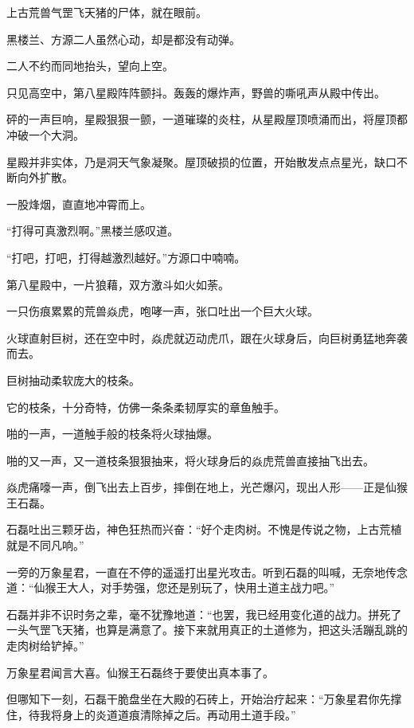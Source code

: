 
\begin{this_body}



上古荒兽气罡飞天猪的尸体，就在眼前。

黑楼兰、方源二人虽然心动，却是都没有动弹。

二人不约而同地抬头，望向上空。

只见高空中，第八星殿阵阵颤抖。轰轰的爆炸声，野兽的嘶吼声从殿中传出。

砰的一声巨响，星殿狠狠一颤，一道璀璨的炎柱，从星殿屋顶喷涌而出，将屋顶都冲破一个大洞。

星殿并非实体，乃是洞天气象凝聚。屋顶破损的位置，开始散发点点星光，缺口不断向外扩散。

一股烽烟，直直地冲霄而上。

“打得可真激烈啊。”黑楼兰感叹道。

“打吧，打吧，打得越激烈越好。”方源口中喃喃。

第八星殿中，一片狼藉，双方激斗如火如荼。

一只伤痕累累的荒兽焱虎，咆哮一声，张口吐出一个巨大火球。

火球直射巨树，还在空中时，焱虎就迈动虎爪，跟在火球身后，向巨树勇猛地奔袭而去。

巨树抽动柔软庞大的枝条。

它的枝条，十分奇特，仿佛一条条柔韧厚实的章鱼触手。

啪的一声，一道触手般的枝条将火球抽爆。

啪的又一声，又一道枝条狠狠抽来，将火球身后的焱虎荒兽直接抽飞出去。

焱虎痛嚎一声，倒飞出去上百步，摔倒在地上，光芒爆闪，现出人形——正是仙猴王石磊。

石磊吐出三颗牙齿，神色狂热而兴奋：“好个走肉树。不愧是传说之物，上古荒植就是不同凡响。”

一旁的万象星君，一直在不停的遥遥打出星光攻击。听到石磊的叫喊，无奈地传念道：“仙猴王大人，对手势强，您还是别玩了，快用土道主战力吧。”

石磊并非不识时务之辈，毫不犹豫地道：“也罢，我已经用变化道的战力。拼死了一头气罡飞天猪，也算是满意了。接下来就用真正的土道修为，把这头活蹦乱跳的走肉树给铲掉。”

万象星君闻言大喜。仙猴王石磊终于要使出真本事了。

但哪知下一刻，石磊干脆盘坐在大殿的石砖上，开始治疗起来：“万象星君你先撑住，待我将身上的炎道道痕清除掉之后。再动用土道手段。”


\end{this_body}
